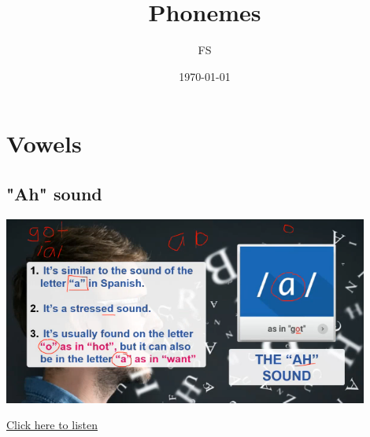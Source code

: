 \documentclass[12pt]{book}
\begin{document}
\title{Phonemes}
\author{FS}
\date{\today}
\maketitle

\frontmatter
\tableofcontents
\mainmatter

\chapter{Vowels}
\section{"Ah" sound }
\begin{center}
\includegraphics[width=0.9\textwidth]{images/image5.png}
\end{center}
\href{https://drive.google.com/file/d/18IaOVK4CQk8SdvJZuLdmHg19YmEYxoLD/view?usp=drive_link}{Click here to listen}
\end{document}
